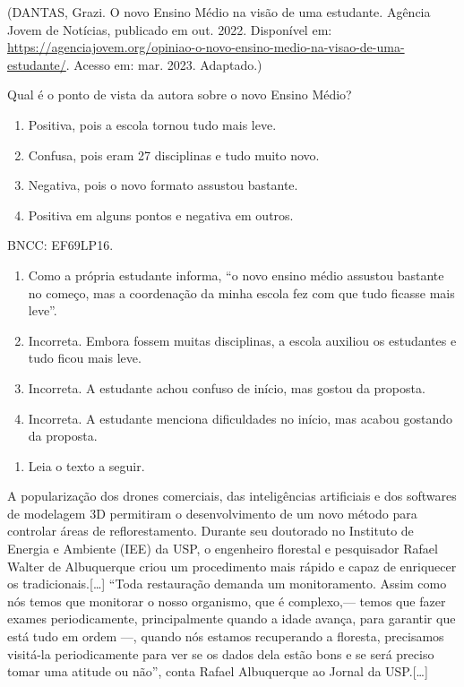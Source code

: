 (DANTAS, Grazi. O novo Ensino Médio na visão de uma estudante. Agência
Jovem de Notícias, publicado em out. 2022. Disponível em: 
\url{https://agenciajovem.org/opiniao-o-novo-ensino-medio-na-visao-de-uma-estudante/}.
Acesso em: mar. 2023. Adaptado.)

Qual é o ponto de vista da autora sobre o novo Ensino Médio?

\begin{enumerate}
\def\labelenumi{\alph{enumi})}
\item
  Positiva, pois a escola tornou tudo mais leve.
\item
  Confusa, pois eram 27 disciplinas e tudo muito novo.
\item
  Negativa, pois o novo formato assustou bastante.
\item
  Positiva em alguns pontos e negativa em outros.
\end{enumerate}

BNCC: EF69LP16.

\begin{enumerate}
\def\labelenumi{\alph{enumi})}
\item
  Como a própria estudante informa, ``o novo ensino médio assustou
  bastante no começo, mas a coordenação da minha escola fez com que tudo
  ficasse mais leve''.
\item
  Incorreta. Embora fossem muitas disciplinas, a escola auxiliou os
  estudantes e tudo ficou mais leve.
\item
  Incorreta. A estudante achou confuso de início, mas gostou da
  proposta.
\item
  Incorreta. A estudante menciona dificuldades no início, mas acabou
  gostando da proposta.
\end{enumerate}

\begin{enumerate}
\def\labelenumi{\arabic{enumi}.}
\setcounter{enumi}{10}
\tightlist
\item
  Leia o texto a seguir.
\end{enumerate}

A popularização dos drones comerciais, das inteligências artificiais e
dos softwares de modelagem 3D permitiram o desenvolvimento de um novo
método para controlar áreas de reflorestamento. Durante seu doutorado no
Instituto de Energia e Ambiente (IEE) da USP, o engenheiro florestal e
pesquisador Rafael Walter de Albuquerque criou um procedimento mais
rápido e capaz de enriquecer os tradicionais.{[}\ldots{}{]} ``Toda
restauração demanda um monitoramento. Assim como nós temos que monitorar
o nosso organismo, que é complexo,--- temos que fazer exames
periodicamente, principalmente quando a idade avança, para garantir que
está tudo em ordem ---, quando nós estamos recuperando a floresta,
precisamos visitá-la periodicamente para ver se os dados dela estão bons
e se será preciso tomar uma atitude ou não'', conta Rafael Albuquerque
ao Jornal da USP.{[}\ldots{}{]}

